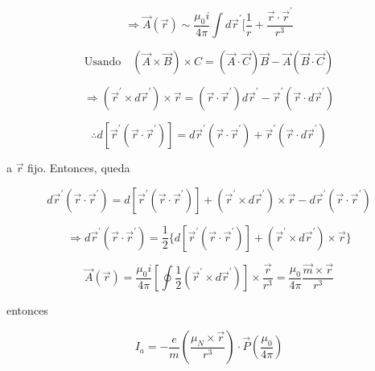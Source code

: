 \documentclass{report}
\begin{document}
\[\Rightarrow \overrightarrow{A}(\overrightarrow{r}) \sim \frac{\mu _{0} i }{4 \pi } \int d \overrightarrow{r}^{\prime } [\frac{1}{r} + \frac{\overrightarrow{r}\cdot \overrightarrow{r}^{\prime}}{r^3 } \]

\[\text{Usando} \quad (\overrightarrow{A} \times \overrightarrow{B}) \times C = (\overrightarrow{A} \cdot \overrightarrow{C}) \overrightarrow{B} - \overrightarrow{A} (\overrightarrow{B} \cdot \overrightarrow{C})\]

\[\Rightarrow (\overrightarrow{r}^{\prime } \times d \overrightarrow{r}^{\prime}) \times \overrightarrow{r} = (\overrightarrow{r} \cdot \overrightarrow{r}^{\prime }) d \overrightarrow{r}^{\prime } - \overrightarrow{r}^{\prime}(\overrightarrow{r} \cdot d \overrightarrow{r}^{\prime })\]

\[\therefore d [\overrightarrow{r}^{\prime }(\overrightarrow{r} \cdot \overrightarrow{r}^{\prime})] = d \overrightarrow{r} ^{\prime} (\overrightarrow{r} \cdot \overrightarrow{r}^{\prime}) + \overrightarrow{r}^{\prime } (\overrightarrow{r} \cdot d\overrightarrow{r}^{\prime })\]

a $\overrightarrow{r}$ fijo. Entonces, queda

\[d\overrightarrow{r}^{\prime } (\overrightarrow{r} \cdot \overrightarrow{r}^{\prime }) = d [\overrightarrow{r}^{\prime}(\overrightarrow{r}\cdot \overrightarrow{r}^{\prime})] + (\overrightarrow{r}^{\prime} \times d \overrightarrow{r}^{\prime})\times \overrightarrow{r} - d\overrightarrow{r}^{\prime} (\overrightarrow{r} \cdot \overrightarrow{r}^{\prime})\]

\[\Rightarrow d \overrightarrow{r}^{\prime } (\overrightarrow{r} \cdot \overrightarrow{r}^{\prime }) = \frac{1}{2} \lbrace d [\overrightarrow{r}^{\prime} (\overrightarrow{r} \cdot \overrightarrow{r}^{\prime})] + (\overrightarrow{r}^{\prime} \times d \overrightarrow{r}^{\prime})\times \overrightarrow{r}\rbrace \]

\begin{equation}
\overrightarrow{A}(\overrightarrow{r}) = \frac{\mu_0 i}{4 \pi} [\oint \frac{1}{2} (\overrightarrow{r}^{\prime} \times d\overrightarrow{r}^{\prime})] \times \frac{\overrightarrow{r}}{r^3 } = \frac{\mu_0 }{4 \pi} \frac{\overrightarrow{m}\times \overrightarrow{r}}{r^3 }
\end{equation}

entonces

\[I_a = - \frac{e}{m} (\frac{\mu _N \times \overrightarrow{r} }{r^3 }) \cdot \overrightarrow{P} (\frac{\mu _0}{4 \pi }) \]
\end{document}
